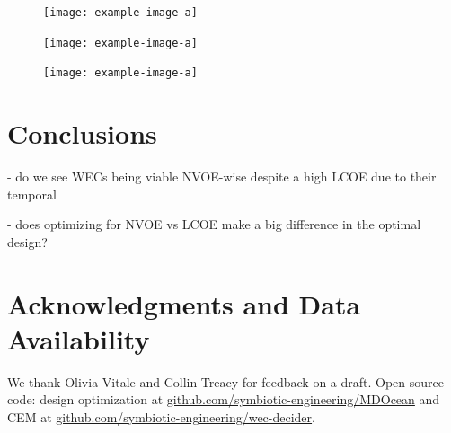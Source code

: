 \documentclass[10pt,twoside]{article}
\begin{document}
\begin{figure}[t]
\noindent
\begin{minipage}[t]{0.325\textwidth}
    \centering
    \texttt{[image: example-image-a]}
    \label{fig:single-obj-compare}
\end{minipage}
\hfill
\begin{minipage}[t]{0.325\textwidth}
    \centering
    \texttt{[image: example-image-a]}
    \label{fig:pareto}
\end{minipage}
\hfill
\begin{minipage}[t]{0.325\textwidth}
    \centering
    \texttt{[image: example-image-a]}
    \label{fig:design-heuristics}
\end{minipage}
\end{figure}

\lipsum[1]

\section{Conclusions}
\lipsum[1]

- do we see WECs being viable NVOE-wise despite a high LCOE due to their temporal

- does optimizing for NVOE vs LCOE make a big difference in the optimal design?

\section*{Acknowledgments and Data Availability}
We thank Olivia Vitale and Collin Treacy for feedback on a draft. Open-source code: design optimization at \url{github.com/symbiotic-engineering/MDOcean} and CEM at \url{github.com/symbiotic-engineering/wec-decider}.

\clearpage

\end{document}
